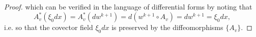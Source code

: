\documentclass[dvipsnames,letterpaper,12pt]{article}
\begin{document}
\begin{proof}





    


    which can be verified in the language of differential forms by noting that
    \[ A_v^*( \xi_0 dx ) = A_v^*(dw^{k+1}) = d( w^{k+1} \circ A_v ) = d w^{k+1} = \xi_0 dx, \]
    i.e. so that the covector field $\xi_0 dx$ is preserved by the diffeomorphisms $\{ A_v \}$.


\end{proof}
\end{document}

